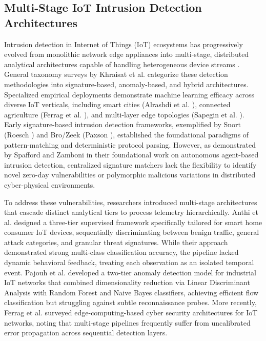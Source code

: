 \documentclass[journal,10pt,onecolumn]{IEEEtran}
\begin{document}
\subsection{Multi-Stage IoT Intrusion Detection Architectures}
Intrusion detection in Internet of Things (IoT) ecosystems has progressively evolved from monolithic network edge appliances into multi-stage, distributed analytical architectures capable of handling heterogeneous device streams \cite{21, 22}. General taxonomy surveys by Khraisat et al. \cite{6} categorize these detection methodologies into signature-based, anomaly-based, and hybrid architectures. Specialized empirical deployments demonstrate machine learning efficacy across diverse IoT verticals, including smart cities (Alrashdi et al. \cite{4}), connected agriculture (Ferrag et al. \cite{5}), and multi-layer edge topologies (Sapegin et al. \cite{32}). Early signature-based intrusion detection frameworks, exemplified by Snort (Roesch \cite{20}) and Bro/Zeek (Paxson \cite{21}), established the foundational paradigms of pattern-matching and deterministic protocol parsing. However, as demonstrated by Spafford and Zamboni \cite{34} in their foundational work on autonomous agent-based intrusion detection, centralized signature matchers lack the flexibility to identify novel zero-day vulnerabilities or polymorphic malicious variations in distributed cyber-physical environments.

To address these vulnerabilities, researchers introduced multi-stage architectures that cascade distinct analytical tiers to process telemetry hierarchically. Anthi et al. \cite{2} designed a three-tier supervised framework specifically tailored for smart home consumer IoT devices, sequentially discriminating between benign traffic, general attack categories, and granular threat signatures. While their approach demonstrated strong multi-class classification accuracy, the pipeline lacked dynamic behavioral feedback, treating each observation as an isolated temporal event. Pajouh et al. \cite{30} developed a two-tier anomaly detection model for industrial IoT networks that combined dimensionality reduction via Linear Discriminant Analysis with Random Forest and Naive Bayes classifiers, achieving efficient flow classification but struggling against subtle reconnaissance probes. More recently, Ferrag et al. \cite{22} surveyed edge-computing-based cyber security architectures for IoT networks, noting that multi-stage pipelines frequently suffer from uncalibrated error propagation across sequential detection layers.
\end{document}
